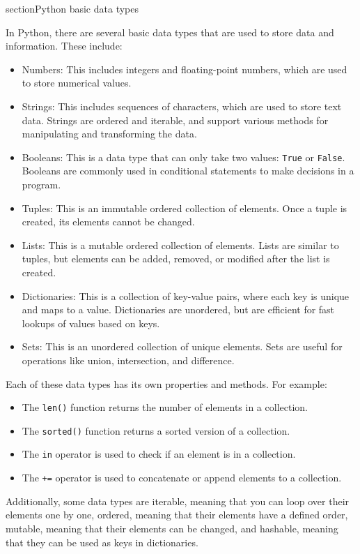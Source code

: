 \documentclass[12pt, a4paper, oneside]{article}
\begin{document}
section{Python basic data types}

In Python, there are several basic data types that are used to store data and information. These include:

\begin{itemize}
\item Numbers: This includes integers and floating-point numbers, which are used to store numerical values.
\item Strings: This includes sequences of characters, which are used to store text data. Strings are ordered and iterable, and support various methods for manipulating and transforming the data.
\item Booleans: This is a data type that can only take two values: \texttt{True} or \texttt{False}. Booleans are commonly used in conditional statements to make decisions in a program.
\item Tuples: This is an immutable ordered collection of elements. Once a tuple is created, its elements cannot be changed.
\item Lists: This is a mutable ordered collection of elements. Lists are similar to tuples, but elements can be added, removed, or modified after the list is created.
\item Dictionaries: This is a collection of key-value pairs, where each key is unique and maps to a value. Dictionaries are unordered, but are efficient for fast lookups of values based on keys.
\item Sets: This is an unordered collection of unique elements. Sets are useful for operations like union, intersection, and difference.
\end{itemize}

Each of these data types has its own properties and methods. For example:

\begin{itemize}
\item The \texttt{len()} function returns the number of elements in a collection.
\item The \texttt{sorted()} function returns a sorted version of a collection.
\item The \texttt{in} operator is used to check if an element is in a collection.
\item The \texttt{+=} operator is used to concatenate or append elements to a collection.
\end{itemize}

Additionally, some data types are iterable, meaning that you can loop over their elements one by one, ordered, meaning that their elements have a defined order, mutable, meaning that their elements can be changed, and hashable, meaning that they can be used as keys in dictionaries.
\end{document}

